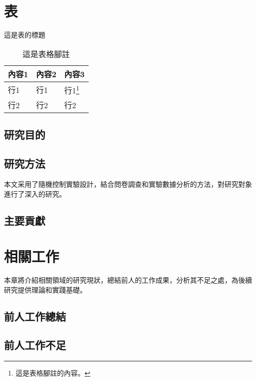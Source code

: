\documentclass[writingLanguage=chinese,
    addPageTitle=on,
    addDeclaration=on,
    addMUSTlog=off,
    addFigTOC=on,   
    addTabTOC=on,
    refIndent=off,
    printMod=off,
]{.def/must}
\begin{document}
\section{表}

\begin{table}
\caption{這是表的標題}
\centering
\begin{tabularx}{\textwidth}{XXX} %
\toprule
內容1 & 內容2 & 內容3 \\
\midrule
行1 & 行1 & 行1\footnote{這是表格腳註的內容。} \\
行2 & 行2 & 行2 \\
\bottomrule
\end{tabularx}
\caption*{這是表格腳註}
\end{table}





\subsection{研究目的}

\txtHere{[1]}

\subsection{研究方法}

本文采用了隨機控制實驗設計，結合問卷調查和實驗數據分析的方法，對研究對象進行了深入的研究。

\subsection{主要貢獻}

\txtHere{[1]}

\section{相關工作}

本章將介紹相關領域的研究現狀，總結前人的工作成果，分析其不足之處，為後續研究提供理論和實踐基礎。

\subsection{前人工作總結}

\txtHere{[1]}

\subsection{前人工作不足}
\end{document}
